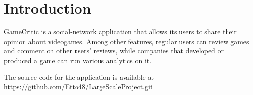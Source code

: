 \chapter{Introduction}
GameCritic is a social-network application that allows its users to share their opinion about videogames.
Among other features, regular users can review games and comment on other users' reviews, while companies that developed or produced
a game can run various analytics on it.

The source code for the application is available at \url{https://github.com/Etto48/LargeScaleProject.git}
